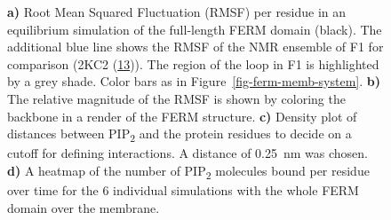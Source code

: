 \documentclass[
  twocolumn]{biophys-new-mod}
\begin{document}
\begin{figure}
\caption{\label{fig-suppl}\textbf{a)} Root Mean Squared Fluctuation
(RMSF) per residue in an equilibrium simulation of the full-length FERM
domain (black). The additional blue line shows the RMSF of the NMR
ensemble of F1 for comparison (2KC2
(\protect\hyperlink{ref-goultStructureDoubleUbiquitinlike2010}{13})).
The region of the loop in F1 is highlighted by a grey shade. Color bars
as in Figure~\ref{fig-ferm-memb-system}. \textbf{b)} The relative
magnitude of the RMSF is shown by coloring the backbone in a render of
the FERM structure. \textbf{c)} Density plot of distances between
PIP\textsubscript{2} and the protein residues to decide on a cutoff for
defining interactions. A distance of 0.25~nm was chosen. \textbf{d)} A
heatmap of the number of PIP\textsubscript{2} molecules bound per
residue over time for the 6 individual simulations with the whole FERM
domain over the membrane.}

\end{figure}
\end{document}

